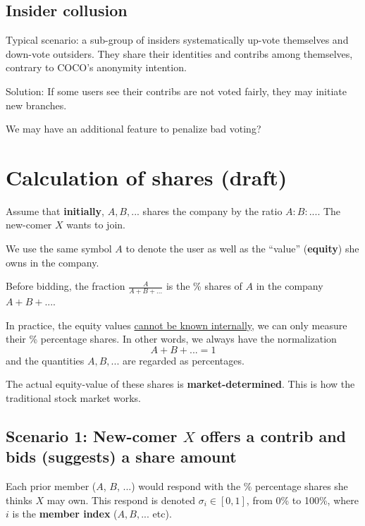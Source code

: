 \documentclass[12pt, orivec]{article}
\begin{document}
\secttoc
\subsection{Insider collusion}

Typical scenario:  a sub-group of insiders systematically up-vote themselves and down-vote outsiders.  They share their identities and contribs among themselves, contrary to COCO's anonymity intention.

Solution:  If some users see their contribs are not voted fairly, they may initiate new branches.

We may have an additional feature to penalize bad voting?


\secttoc
\section{Calculation of shares (draft)}

Assume that \textbf{initially}, $A, B, ...$ shares the company by the ratio $A : B : ...$.  The new-comer $X$ wants to join.

We use the same symbol $A$ to denote the user as well as the ``value'' (\textbf{equity}) she owns in the company.  

Before bidding, the fraction $\frac{A}{A + B + ...}$ is the \% shares of $A$ in the company $A + B + ...$.

In practice, the equity values \uline{cannot be known internally}, we can only measure their \% percentage shares.  In other words, we always have the normalization
\begin{equation}
A + B + ... = 1
\end{equation}
and the quantities $A, B, ...$ are regarded as percentages.

The actual equity-value of these shares is \textbf{market-determined}.  This is how the traditional stock market works.

\secttoc
\subsection{Scenario 1:  New-comer $X$ offers a contrib and bids (suggests) a share amount}

Each prior member ($A$, $B$, ...) would respond with the \% percentage shares she thinks $X$ may own.  This respond is denoted $\sigma_i \in [0,1]$, from 0\% to 100\%, where $i$ is the \textbf{member index} ($A, B, ... $ etc).
\end{document}

